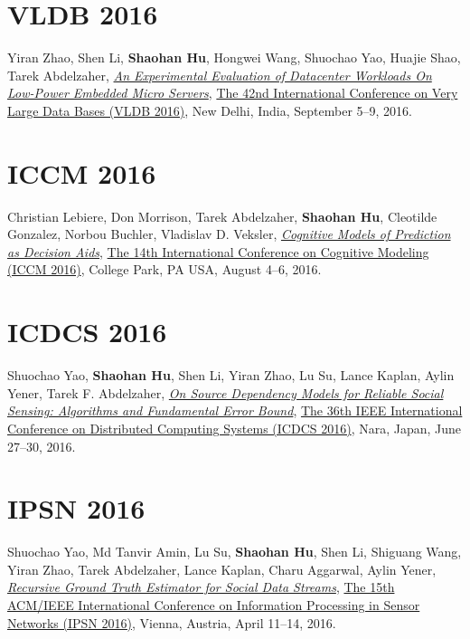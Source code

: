 \section{\sc VLDB 2016}\hypertarget{zhao2016vldb}{}
Yiran Zhao, Shen Li, \textbf{Shaohan Hu}, Hongwei Wang, Shuochao Yao, Huajie Shao, Tarek Abdelzaher,
\href{http://dl.acm.org/citation.cfm?id=2947625}{\emph{An Experimental Evaluation of Datacenter Workloads On Low-Power Embedded Micro Servers}},
\href{http://vldb2016.persistent.com/}{\textsf{The 42nd International Conference on Very Large Data Bases (VLDB 2016)}},
New Delhi, India, September 5--9, 2016.

\section{\sc ICCM 2016}\hypertarget{Lebiere2016iccm}{}
Christian Lebiere, Don Morrison, Tarek Abdelzaher, \textbf{Shaohan Hu}, Cleotilde Gonzalez, Norbou Buchler, Vladislav D. Veksler,
\href{http://acs.ist.psu.edu/iccm2016/proceedings/lebiere2016iccm.pdf}{\emph{Cognitive Models of Prediction as Decision Aids}},
\href{http://acs.ist.psu.edu/iccm2016/}{\textsf{The 14th International Conference on Cognitive Modeling (ICCM 2016)}},
College Park, PA USA, August 4--6, 2016.

\section{\sc ICDCS 2016}\hypertarget{yao2016icdcs}{}
Shuochao Yao, \textbf{Shaohan Hu}, Shen Li, Yiran Zhao, Lu Su, Lance Kaplan, Aylin Yener, Tarek F. Abdelzaher,
\href{http://ieeexplore.ieee.org/document/7536545}{\emph{On Source Dependency Models for Reliable Social Sensing: Algorithms and Fundamental Error Bound}},
\href{http://www-higashi.ist.osaka-u.ac.jp/icdcs2016/}{\textsf{The 36th IEEE International Conference on Distributed Computing Systems (ICDCS 2016)}},
Nara, Japan, June 27--30, 2016.

\section{\sc IPSN 2016}\hypertarget{yao2016ipsn}{}
Shuochao Yao, Md Tanvir Amin, Lu Su, \textbf{Shaohan Hu}, Shen Li, Shiguang Wang, Yiran Zhao, Tarek Abdelzaher, Lance Kaplan, Charu Aggarwal, Aylin Yener,
\href{http://ieeexplore.ieee.org/document/7460719}{\emph{Recursive Ground Truth Estimator for Social Data Streams}},
\href{http://ipsn.acm.org/2016/}{\textsf{The 15th ACM/IEEE International Conference on Information Processing in Sensor Networks (IPSN 2016)}},
Vienna, Austria, April 11--14, 2016.

